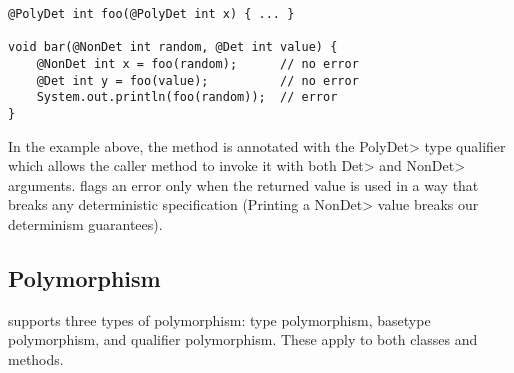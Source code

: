 \begin{verbatim}
@PolyDet int foo(@PolyDet int x) { ... }

void bar(@NonDet int random, @Det int value) {
    @NonDet int x = foo(random);      // no error
    @Det int y = foo(value);          // no error
    System.out.println(foo(random));  // error
}
\end{verbatim}
In the example above, the method  is annotated with the \<PolyDet> type qualifier which allows
the caller method  to invoke it with both \<Det> and \<NonDet> arguments. \TheDeterminismChecker flags an error 
only when the returned value is used in a way that breaks any deterministic specification (Printing a \<NonDet> value
breaks our determinism guarantees).





\subsection{Polymorphism}\label{java-polymorphism}

\OurTypeSystem supports three types of polymorphism:  type
polymorphism, basetype polymorphism, and qualifier polymorphism.
These apply to both classes and methods.

